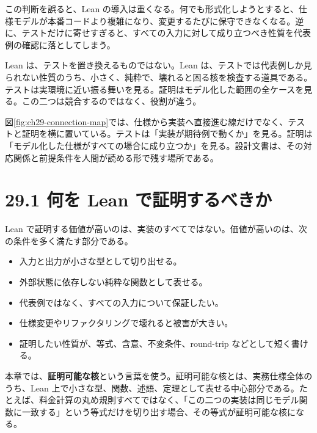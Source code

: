 この判断を誤ると、Lean の導入は重くなる。何でも形式化しようとすると、仕様モデルが本番コードより複雑になり、変更するたびに保守できなくなる。逆に、テストだけに寄せすぎると、すべての入力に対して成り立つべき性質を代表例の確認に落としてしまう。

\begin{intuitionbox}
Lean は、テストを置き換えるものではない。Lean は、テストでは代表例しか見られない性質のうち、小さく、純粋で、壊れると困る核を検査する道具である。テストは実環境に近い振る舞いを見る。証明はモデル化した範囲の全ケースを見る。この二つは競合するのではなく、役割が違う。
\end{intuitionbox}


図\ref{fig:ch29-connection-map}では、仕様から実装へ直接進む線だけでなく、テストと証明を横に置いている。テストは「実装が期待例で動くか」を見る。証明は「モデル化した仕様がすべての場合に成り立つか」を見る。設計文書は、その対応関係と前提条件を人間が読める形で残す場所である。

\section{29.1 何を Lean で証明するべきか}

Lean で証明する価値が高いのは、実装のすべてではない。価値が高いのは、次の条件を多く満たす部分である。

\begin{itemize}
\item 入力と出力が小さな型として切り出せる。
\item 外部状態に依存しない純粋な関数として表せる。
\item 代表例ではなく、すべての入力について保証したい。
\item 仕様変更やリファクタリングで壊れると被害が大きい。
\item 証明したい性質が、等式、含意、不変条件、round-trip などとして短く書ける。
\end{itemize}

\begin{definitionbox}
本章では、\textbf{証明可能な核}という言葉を使う。証明可能な核とは、実務仕様全体のうち、Lean 上で小さな型、関数、述語、定理として表せる中心部分である。たとえば、料金計算の丸め規則すべてではなく、「この二つの実装は同じモデル関数に一致する」という等式だけを切り出す場合、その等式が証明可能な核になる。
\end{definitionbox}

